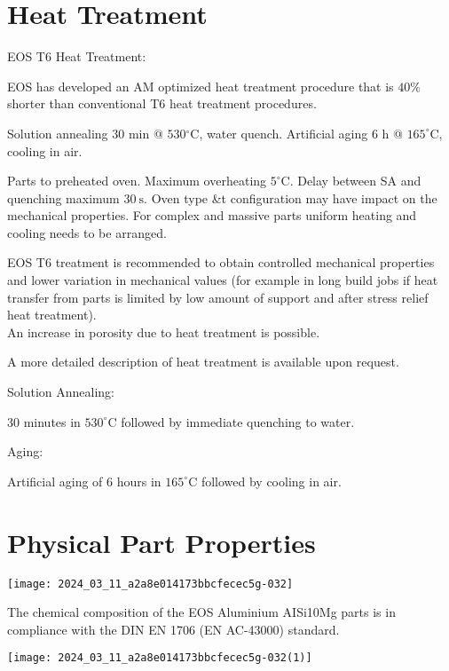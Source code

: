 \documentclass[10pt]{article}
\begin{document}
\section*{Heat Treatment}
EOS T6 Heat Treatment:

EOS has developed an AM optimized heat treatment procedure that is $40 \%$ shorter than conventional T6 heat treatment procedures.

Solution annealing 30 min @ $530{ }^{\circ} \mathrm{C}$, water quench. Artificial aging 6 h @ $165^{\circ} \mathrm{C}$, cooling in air.

Parts to preheated oven. Maximum overheating $5^{\circ} \mathrm{C}$. Delay between SA and quenching maximum $30 \mathrm{~s}$. Oven type \&t configuration may have impact on the mechanical properties. For complex and massive parts uniform heating and cooling needs to be arranged.

EOS T6 treatment is recommended to obtain controlled mechanical properties and lower variation in mechanical values (for example in long build jobs if heat transfer from parts is limited by low amount of support and after stress relief heat treatment).\\
An increase in porosity due to heat treatment is possible.

A more detailed description of heat treatment is available upon request.

Solution Annealing:

30 minutes in $530^{\circ} \mathrm{C}$ followed by immediate quenching to water.

Aging:

Artificial aging of 6 hours in $165^{\circ} \mathrm{C}$ followed by cooling in air.

\section*{Physical Part Properties}
\begin{center}
\texttt{[image: 2024\_03\_11\_a2a8e014173bbcfecec5g-032]}
\end{center}

The chemical composition of the EOS Aluminium AISi10Mg parts is in compliance with the DIN EN 1706 (EN AC-43000) standard.

\begin{center}
\texttt{[image: 2024\_03\_11\_a2a8e014173bbcfecec5g-032(1)]}
\end{center}
\end{document}
